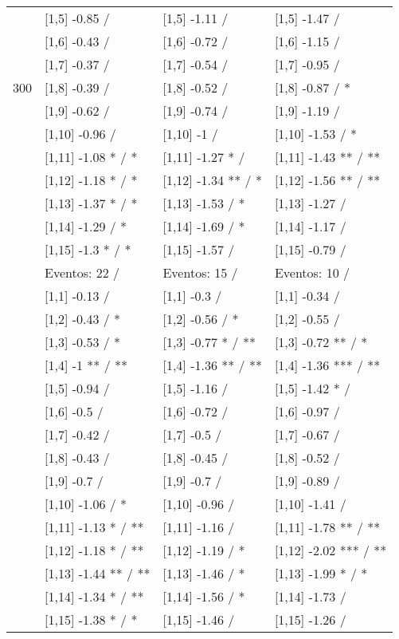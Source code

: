 \begin{table}
\begin{tabular}[t]{llll}
 & {}[1,5] -0.85  / & {}[1,5] -1.11  / & {}[1,5] -1.47  /\\
 & {}[1,6] -0.43  / & {}[1,6] -0.72  / & {}[1,6] -1.15  /\\
 & {}[1,7] -0.37  / & {}[1,7] -0.54  / & {}[1,7] -0.95  /\\
300 & {}[1,8] -0.39  / & {}[1,8] -0.52  / & {}[1,8] -0.87  / *\\
\addlinespace
 & {}[1,9] -0.62  / & {}[1,9] -0.74  / & {}[1,9] -1.19  /\\
 & {}[1,10] -0.96  / & {}[1,10] -1  / & {}[1,10] -1.53  / *\\
 & {}[1,11] -1.08 * / * & {}[1,11] -1.27 * / & {}[1,11] -1.43 ** / **\\
 & {}[1,12] -1.18 * / * & {}[1,12] -1.34 ** / * & {}[1,12] -1.56 ** / **\\
 & {}[1,13] -1.37 * / * & {}[1,13] -1.53  / * & {}[1,13] -1.27  /\\
\addlinespace
 & {}[1,14] -1.29  / * & {}[1,14] -1.69  / * & {}[1,14] -1.17  /\\
 & {}[1,15] -1.3 * / * & {}[1,15] -1.57  / & {}[1,15] -0.79  /\\
 & Eventos:  22 / & Eventos:  15 / & Eventos:  10 /\\
 & {}[1,1] -0.13  / & {}[1,1] -0.3  / & {}[1,1] -0.34  /\\
 & {}[1,2] -0.43  / * & {}[1,2] -0.56  / * & {}[1,2] -0.55  /\\
\addlinespace
 & {}[1,3] -0.53  / * & {}[1,3] -0.77 * / ** & {}[1,3] -0.72 ** / *\\
 & {}[1,4] -1 ** / ** & {}[1,4] -1.36 ** / ** & {}[1,4] -1.36 *** / **\\
 & {}[1,5] -0.94  / & {}[1,5] -1.16  / & {}[1,5] -1.42 * /\\
 & {}[1,6] -0.5  / & {}[1,6] -0.72  / & {}[1,6] -0.97  /\\
 & {}[1,7] -0.42  / & {}[1,7] -0.5  / & {}[1,7] -0.67  /\\
\addlinespace
500 & {}[1,8] -0.43  / & {}[1,8] -0.45  / & {}[1,8] -0.52  /\\
 & {}[1,9] -0.7  / & {}[1,9] -0.7  / & {}[1,9] -0.89  /\\
 & {}[1,10] -1.06  / * & {}[1,10] -0.96  / & {}[1,10] -1.41  /\\
 & {}[1,11] -1.13 * / ** & {}[1,11] -1.16  / & {}[1,11] -1.78 ** / **\\
 & {}[1,12] -1.18 * / ** & {}[1,12] -1.19  / * & {}[1,12] -2.02 *** / **\\
\addlinespace
 & {}[1,13] -1.44 ** / ** & {}[1,13] -1.46  / * & {}[1,13] -1.99 * / *\\
 & {}[1,14] -1.34 * / ** & {}[1,14] -1.56  / * & {}[1,14] -1.73  /\\
 & {}[1,15] -1.38 * / * & {}[1,15] -1.46  / & {}[1,15] -1.26  /\\
\bottomrule
\end{tabular}
\end{table}
